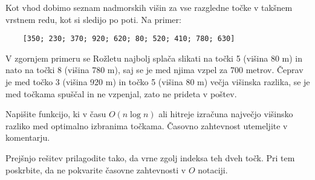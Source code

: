 \documentclass[arhiv]{../izpit}
\begin{document}
Kot vhod dobimo seznam nadmorskih višin za vse razgledne točke v takšnem vrstnem redu, kot si sledijo po poti. Na primer:
\begin{verbatim}
    [350; 230; 370; 920; 620; 80; 520; 410; 780; 630]
\end{verbatim}
V zgornjem primeru se Rožletu najbolj splača slikati na točki 5 (višina 80 m) in nato na točki 8 (višina 780 m), saj se je med njima vzpel za 700 metrov. Čeprav je med točko 3 (višina 920 m) in točko 5 (višina 80 m) večja višinska razlika, se je med točkama spuščal in ne vzpenjal, zato ne prideta v poštev.


\podnaloga
Napišite funkcijo, ki v času $O(n \log n)$ ali hitreje izračuna največjo višinsko razliko med optimalno izbranima točkama. Časovno zahtevnost utemeljite v komentarju.

\podnaloga
Prejšnjo rešitev prilagodite tako, da vrne zgolj indeksa teh dveh točk. Pri tem poskrbite, da ne pokvarite časovne zahtevnosti v $O$ notaciji.
\end{document}
